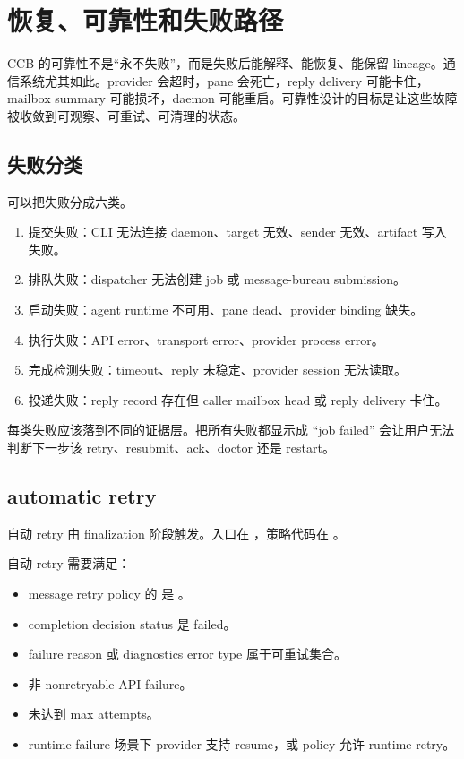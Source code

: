 \chapter{恢复、可靠性和失败路径}

CCB 的可靠性不是“永不失败”，而是失败后能解释、能恢复、能保留 lineage。通信系统尤其如此。provider 会超时，pane 会死亡，reply delivery 可能卡住，mailbox summary 可能损坏，daemon 可能重启。可靠性设计的目标是让这些故障被收敛到可观察、可重试、可清理的状态。

\section{失败分类}

可以把失败分成六类。

\begin{enumerate}
  \item 提交失败：CLI 无法连接 daemon、target 无效、sender 无效、artifact 写入失败。
  \item 排队失败：dispatcher 无法创建 job 或 message-bureau submission。
  \item 启动失败：agent runtime 不可用、pane dead、provider binding 缺失。
  \item 执行失败：API error、transport error、provider process error。
  \item 完成检测失败：timeout、reply 未稳定、provider session 无法读取。
  \item 投递失败：reply record 存在但 caller mailbox head 或 reply delivery 卡住。
\end{enumerate}

每类失败应该落到不同的证据层。把所有失败都显示成 “job failed” 会让用户无法判断下一步该 retry、resubmit、ack、doctor 还是 restart。

\section{automatic retry}

自动 retry 由 finalization 阶段触发。入口在 ，策略代码在 。

自动 retry 需要满足：

\begin{itemize}
  \item message retry policy 的  是 。
  \item completion decision status 是 failed。
  \item failure reason 或 diagnostics error type 属于可重试集合。
  \item 非 nonretryable API failure。
  \item 未达到 max attempts。
  \item runtime failure 场景下 provider 支持 resume，或 policy 允许 runtime retry。
\end{itemize}

